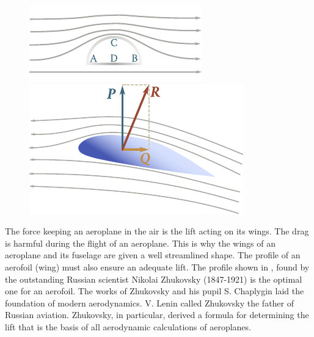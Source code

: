 \begin{figure}[t]
	\begin{minipage}[t]{0.5\linewidth}
		\begin{center}
			\includegraphics[scale=1.0]{figures/ch_09/fig_9_18.pdf}
			\caption[]{}
			\label{fig:9_18}
		\end{center}
	\end{minipage}
	\hspace{-0.1cm}
	\begin{minipage}[t]{0.5\linewidth}
		\begin{center}
			\includegraphics[scale=1.0]{figures/ch_09/fig_9_19.pdf}
			\caption[]{}
			\label{fig:9_19}
		\end{center}
	\end{minipage}
	\vspace{-0.5cm}
\end{figure}

The force keeping an aeroplane in the air is the lift acting on its wings. The drag is harmful during the flight of an aeroplane. This is why the wings of an aeroplane and its fuselage are given a well streamlined shape. The profile of an aerofoil (wing) must also ensure an adequate lift. The profile shown in , found by the outstanding Russian scientist Nikolai Zhukovsky (1847-1921) is the optimal one for an aerofoil. The works of Zhukovsky and his pupil S. Chaplygin laid the foundation of modern aerodynamics. V. Lenin called Zhukovsky the father of Russian aviation. Zhukovsky, in particular, derived a formula for determining the lift that is the basis of all aerodynamic calculations of aeroplanes.

